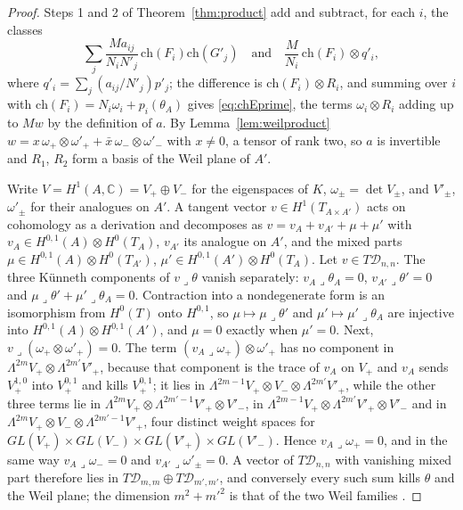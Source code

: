 \documentclass[11pt,reqno]{amsart}
\numberwithin{equation}{section}
\theoremstyle{plain}
\theoremstyle{definition}
\newcommand{\CC}{\mathbb{C}}
\newcommand{\ch}{\mathrm{ch}}
\newcommand{\cD}{\mathcal{D}}
\begin{document}
\begin{proof}
Steps 1 and 2 of Theorem~\ref{thm:product} add and subtract, for each $i$, the classes
\[
\sum_{j}\frac{Ma_{ij}}{N_{i}N'_{j}}\,\ch(F_{i})\ch(G'_{j})\quad\text{and}\quad\frac{M}{N_{i}}\,\ch(F_{i})\otimes q'_{i},
\]
where $q'_{i}=\sum_{j}(a_{ij}/N'_{j})p'_{j}$; the difference is $\ch(F_{i})\otimes R_{i}$, and summing over $i$ with $\ch(F_{i})=N_{i}\omega_{i}+p_{i}(\theta_{A})$ gives \eqref{eq:chEprime}, the terms $\omega_{i}\otimes R_{i}$ adding up to $Mw$ by the definition of $a$. By Lemma~\ref{lem:weilproduct} $w=x\,\omega_{+}\otimes\omega'_{+}+\bar x\,\omega_{-}\otimes\omega'_{-}$ with $x\ne0$, a tensor of rank two, so $a$ is invertible and $R_{1}$, $R_{2}$ form a basis of the Weil plane of $A'$.

Write $V=H^{1}(A,\CC)=V_{+}\oplus V_{-}$ for the eigenspaces of $K$, $\omega_{\pm}=\det V_{\pm}$, and $V'_{\pm}$, $\omega'_{\pm}$ for their analogues on $A'$. A tangent vector $v\in H^{1}(T_{A\times A'})$ acts on cohomology as a derivation and decomposes as $v=v_{A}+v_{A'}+\mu+\mu'$ with $v_{A}\in H^{0,1}(A)\otimes H^{0}(T_{A})$, $v_{A'}$ its analogue on $A'$, and the mixed parts $\mu\in H^{0,1}(A)\otimes H^{0}(T_{A'})$, $\mu'\in H^{0,1}(A')\otimes H^{0}(T_{A})$. Let $v\in T\cD_{n,n}$. The three K\"unneth components of $v\lrcorner\theta$ vanish separately: $v_{A}\lrcorner\theta_{A}=0$, $v_{A'}\lrcorner\theta'=0$ and $\mu\lrcorner\theta'+\mu'\lrcorner\theta_{A}=0$. Contraction into a nondegenerate form is an isomorphism from $H^{0}(T)$ onto $H^{0,1}$, so $\mu\mapsto\mu\lrcorner\theta'$ and $\mu'\mapsto\mu'\lrcorner\theta_{A}$ are injective into $H^{0,1}(A)\otimes H^{0,1}(A')$, and $\mu=0$ exactly when $\mu'=0$. Next, $v\lrcorner(\omega_{+}\otimes\omega'_{+})=0$. The term $(v_{A}\lrcorner\omega_{+})\otimes\omega'_{+}$ has no component in $\Lambda^{2m}V_{+}\otimes\Lambda^{2m'}V'_{+}$, because that component is the trace of $v_{A}$ on $V_{+}$ and $v_{A}$ sends $V_{+}^{1,0}$ into $V_{+}^{0,1}$ and kills $V_{+}^{0,1}$; it lies in $\Lambda^{2m-1}V_{+}\otimes V_{-}\otimes\Lambda^{2m'}V'_{+}$, while the other three terms lie in $\Lambda^{2m}V_{+}\otimes\Lambda^{2m'-1}V'_{+}\otimes V'_{-}$, in $\Lambda^{2m-1}V_{+}\otimes\Lambda^{2m'}V'_{+}\otimes V'_{-}$ and in $\Lambda^{2m}V_{+}\otimes V_{-}\otimes\Lambda^{2m'-1}V'_{+}$, four distinct weight spaces for $GL(V_{+})\times GL(V_{-})\times GL(V'_{+})\times GL(V'_{-})$. Hence $v_{A}\lrcorner\omega_{+}=0$, and in the same way $v_{A}\lrcorner\omega_{-}=0$ and $v_{A'}\lrcorner\omega'_{\pm}=0$. A vector of $T\cD_{n,n}$ with vanishing mixed part therefore lies in $T\cD_{m,m}\oplus T\cD_{m',m'}$, and conversely every such sum kills $\theta$ and the Weil plane; the dimension $m^{2}+m'^{2}$ is that of the two Weil families \cite{Weil77}.


\end{proof}
\end{document}
